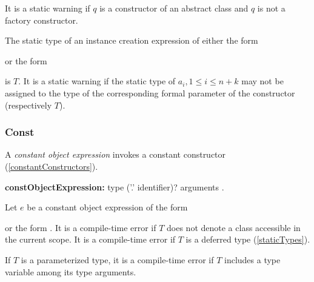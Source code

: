 \documentclass{article}
\begin{document}
\LMHash{}
It is a static warning if $q$ is a constructor of an abstract class and $q$ is not a factory constructor.



\LMHash{}
The static type of an instance creation expression of either the form


or the form


is $T$.
It is a static warning if the static type of $a_i, 1 \le i \le n + k$ may not be assigned to the type of the corresponding formal parameter of the constructor  (respectively $T$).


\subsubsection{Const}

\LMHash{}
A {\em constant object expression} invokes a constant constructor (\ref{constantConstructors}).

\begin{grammar}
{\bf constObjectExpression:}\CONST{} type ('{\escapegrammar .}' identifier)? arguments
  .
\end{grammar}

\LMHash{}
Let $e$ be a constant object expression of the form


or the form
.
It is a compile-time error if $T$ does not denote a class accessible in the current scope.
It is a compile-time error if $T$ is a deferred type (\ref{staticTypes}).


\LMHash{}
If $T$ is a parameterized type, it is a compile-time error if $T$ includes a type variable among its type arguments.
\end{document}
